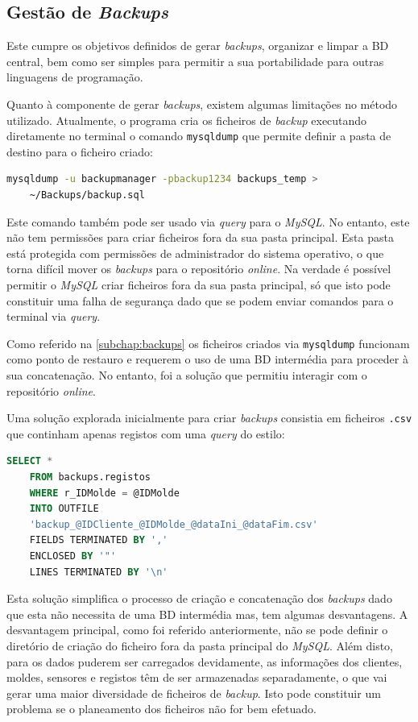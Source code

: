 \documentclass[11pt,twoside,a4paper]{report}
\begin{document}
\subsection{Gestão de \textit{Backups}}
Este cumpre os objetivos definidos de gerar \textit{backups}, organizar e limpar a BD central, bem como ser simples para permitir a sua portabilidade para outras linguagens de programação.\par 
Quanto à componente de gerar \textit{backups}, existem algumas limitações no método utilizado. Atualmente, o programa cria os ficheiros de \textit{backup} executando diretamente no terminal o comando \texttt{mysqldump} que permite definir a pasta de destino para o ficheiro criado:
\begin{lstlisting}[language = bash]
	mysqldump -u backupmanager -pbackup1234 backups_temp >
	~/Backups/backup.sql
\end{lstlisting}
Este comando também pode ser usado via \textit{query} para o \textit{MySQL}. No entanto, este não tem permissões para criar ficheiros fora da sua pasta principal. Esta pasta está protegida com permissões de administrador do sistema operativo, o que torna difícil mover os \textit{backups} para o repositório \textit{online}. Na verdade é possível permitir o \textit{MySQL} criar ficheiros fora da sua pasta principal, só que isto pode constituir uma falha de segurança dado que se podem enviar comandos para o terminal via \textit{query}.\par 
Como referido na \autoref{subchap:backups} os ficheiros criados via \texttt{mysqldump} funcionam como ponto de restauro e requerem o uso de uma BD intermédia para proceder à sua concatenação. No entanto, foi a solução que permitiu interagir com o repositório \textit{online}.\par 
Uma solução explorada inicialmente para criar \textit{backups} consistia em ficheiros \texttt{.csv} que continham apenas registos com uma \textit{query} do estilo:
\begin{lstlisting}[language = SQL]
	SELECT *
	FROM backups.registos
	WHERE r_IDMolde = @IDMolde
	INTO OUTFILE
	'backup_@IDCliente_@IDMolde_@dataIni_@dataFim.csv'
	FIELDS TERMINATED BY ','
	ENCLOSED BY '"'
	LINES TERMINATED BY '\n'
\end{lstlisting}
Esta solução simplifica o processo de criação e concatenação dos \textit{backups} dado que esta não necessita de uma BD intermédia mas, tem algumas desvantagens. A desvantagem principal, como foi referido anteriormente, não se pode definir o diretório de criação do ficheiro fora da pasta principal do \textit{MySQL}. Além disto, para os dados puderem ser carregados devidamente, as informações dos clientes, moldes, sensores e registos têm de ser armazenadas separadamente, o que vai gerar uma maior diversidade de ficheiros de \textit{backup}. Isto pode constituir um problema se o planeamento dos ficheiros não for bem efetuado.\par 
\end{document}
